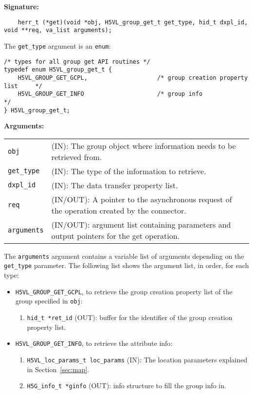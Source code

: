 \begin{mdframed}[style=bgbox]
\textbf{Signature:}
\begin{lstlisting}
    herr_t (*get)(void *obj, H5VL_group_get_t get_type, hid_t dxpl_id, void **req, va_list arguments);
\end{lstlisting}

The \texttt{get\_type} argument is an \texttt{enum}:
\begin{lstlisting}
/* types for all group get API routines */
typedef enum H5VL_group_get_t {                                                  
    H5VL_GROUP_GET_GCPL,                    /* group creation property list     */
    H5VL_GROUP_GET_INFO                     /* group info                       */
} H5VL_group_get_t; 
\end{lstlisting}

\textbf{Arguments:}\\
\begin{tabular}{l p{13.5cm}}
  \texttt{obj} & (IN): The group object where information needs to be
  retrieved from.\\
  \texttt{get\_type} & (IN): The type of the information to retrieve.\\
  \texttt{dxpl\_id} & (IN): The data transfer property list.\\
  \texttt{req} & (IN/OUT): A pointer to the asynchronous request of the
  operation created by the connector.\\
  \texttt{arguments} & (IN/OUT): argument list containing parameters and
  output pointers for the get operation. \\
\end{tabular}
\end{mdframed}

The \texttt{arguments} argument contains a variable list of arguments
depending on the \texttt{get\_type} parameter. The following list shows
the argument list, in order, for each type:

\begin{itemize}
\item \texttt{H5VL\_GROUP\_GET\_GCPL}, to retrieve the group creation
  property list of the group specified in \texttt{obj}:
  \begin{enumerate}
  \item \texttt{hid\_t *ret\_id} (OUT): buffer for the identifier of the
    group creation property list.
  \end{enumerate}

\item \texttt{H5VL\_GROUP\_GET\_INFO}, to retrieve the attribute info:
  \begin{enumerate}
  \item \texttt{H5VL\_loc\_params\_t loc\_params} (IN): The location parameters
    explained in Section~\ref{sec:map}. 
  \item \texttt{H5G\_info\_t *ginfo} (OUT): info structure to fill the
    group info in.
  \end{enumerate}
\end{itemize}

